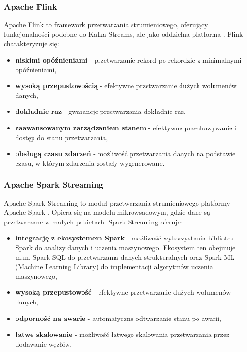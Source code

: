 \subsubsection{Apache Flink}
\label{subsubsec:apache_flink}

Apache Flink to framework przetwarzania strumieniowego, oferujący funkcjonalności podobne do Kafka Streams,
ale jako oddzielna platforma \cite{flink}. Flink charakteryzuje się:

\begin{itemize}
    \item \textbf{niskimi opóźnieniami} - przetwarzanie rekord po rekordzie z minimalnymi opóźnieniami,
    \item \textbf{wysoką przepustowością} - efektywne przetwarzanie dużych wolumenów danych,
    \item \textbf{dokładnie raz} - gwarancje przetwarzania dokładnie raz,
    \item \textbf{zaawansowanym zarządzaniem stanem} - efektywne przechowywanie i dostęp do stanu przetwarzania,
    \item \textbf{obsługą czasu zdarzeń} - możliwość przetwarzania danych na podstawie czasu, w którym zdarzenia zostały wygenerowane.
\end{itemize}

\subsubsection{Apache Spark Streaming}
\label{subsubsec:spark_streaming}

Apache Spark Streaming to moduł przetwarzania strumieniowego platformy Apache Spark \cite{spark_streaming}.
Opiera się na modelu mikrowsadowym, gdzie dane są przetwarzane w małych pakietach. Spark Streaming oferuje:

\begin{itemize}
    \item \textbf{integrację z ekosystemem Spark} - możliwość wykorzystania bibliotek Spark do analizy danych i uczenia maszynowego. Ekosystem ten obejmuje m.in. Spark SQL do przetwarzania danych strukturalnych oraz Spark ML (Machine Learning Library) do implementacji algorytmów uczenia maszynowego,
    \item \textbf{wysoką przepustowość} - efektywne przetwarzanie dużych wolumenów danych,
    \item \textbf{odporność na awarie} - automatyczne odtwarzanie stanu po awarii,
    \item \textbf{łatwe skalowanie} - możliwość łatwego skalowania przetwarzania przez dodawanie węzłów.
\end{itemize}

